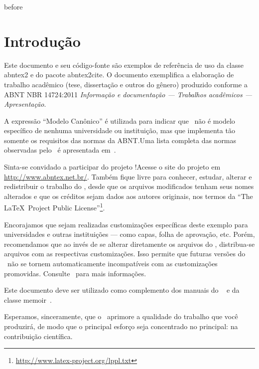\documentclass[
    12pt,
openright,             %
    twoside,               %
    a4paper,
french,            %
ngerman,           %
spanish,           %
brazil,            %
british,           %
    ]{abntex2}
\begin{document}
{before}

\textual{}  %

\chapter{Introdução}

Este documento e seu código-fonte são exemplos de referência de uso da classe
\textsf{abntex2} e do pacote \textsf{abntex2cite}. O documento
exemplifica a elaboração de trabalho acadêmico (tese, dissertação e outros do
gênero) produzido conforme a ABNT NBR 14724:2011 \emph{Informação e documentação
--- Trabalhos acadêmicos --- Apresentação}.

A expressão ``Modelo Canônico'' é utilizada para indicar que \abnTeX\ não é
modelo específico de nenhuma universidade ou instituição, mas que implementa tão
somente os requisitos das normas da ABNT.\@ Uma lista completa das normas
observadas pelo \abnTeX\ é apresentada em~.

Sinta-se convidado a participar do projeto \abnTeX!\@ Acesse o site do projeto em
\url{http://www.abntex.net.br/}. Também fique livre para conhecer,
estudar, alterar e redistribuir o trabalho do \abnTeX, desde que os arquivos
modificados tenham seus nomes alterados e que os créditos sejam dados aos
autores originais, nos termos da ``The \LaTeX\ Project Public
License''\footnote{\url{http://www.latex-project.org/lppl.txt}}.

Encorajamos que sejam realizadas customizações específicas deste exemplo para
universidades e outras instituições --- como capas, folha de aprovação, etc.
Porém, recomendamos que ao invés de se alterar diretamente os arquivos do
\abnTeX, distribua-se arquivos com as respectivas customizações.
Isso permite que futuras versões do \abnTeX~não se tornem automaticamente
incompatíveis com as customizações promovidas. Consulte~ para mais informações.

Este documento deve ser utilizado como complemento dos manuais do \abnTeX~\cite{abntex2classe,abntex2cite,abntex2cite-alf} e da classe \textsf{memoir}~\cite{memoir}.

Esperamos, sinceramente, que o \abnTeX\ aprimore a qualidade do trabalho que
você produzirá, de modo que o principal esforço seja concentrado no principal:
na contribuição científica.
\end{document}
